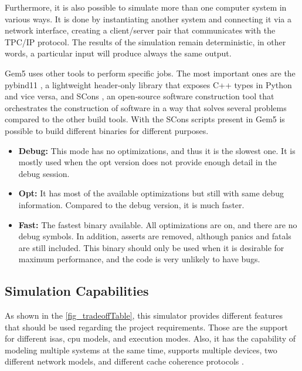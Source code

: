 Furthermore, it is also possible to simulate more than one computer system in various ways. It is done by instantiating another system and 
connecting it via a network interface, creating a client/server pair that communicates with the TPC/IP protocol. The results of the simulation 
remain deterministic, in other words, a particular input will produce always the same output. 

Gem5 uses other tools to perform specific jobs. The most important ones are the pybind11 \cite{jakob2019pybind11}, a lightweight header-only 
library that exposes C++ types in Python and vice versa, and SCons \cite{knight2002scons}, an open-source software construction tool that 
orchestrates the construction of software in a way that solves several problems compared to the other build tools. With the SCons scripts 
present in Gem5 is possible to build different binaries for different purposes. 

\begin{itemize}
    \item \textbf{Debug:} This mode has no optimizations, and thus it is the slowest one. It is mostly used when the opt version does not 
	provide enough detail in the debug session. 

    \item \textbf{Opt:} It has most of the available optimizations but still with same debug information. Compared to the debug version, it 
	is much faster.

    \item \textbf{Fast:} The fastest binary available. All optimizations are on, and there are no debug symbols. In addition, asserts are 
	removed, although panics and fatals are still included. This binary should only be used when it is desirable for maximum performance, and 
	the code is very unlikely to have bugs.
\end{itemize}

\subsection{Simulation Capabilities}
\label{subsec::SimCap}

As shown in the \autoref{fig_tradeoffTable}, this simulator provides different features that should be used regarding the project requirements. 
Those are the support for different \glspl{isa}, \gls{cpu} models, and execution modes. Also, it has the capability of modeling multiple systems 
at the same time, supports multiple devices, two different network models, and different cache coherence protocols \cite{TheGem5Simulator}.

